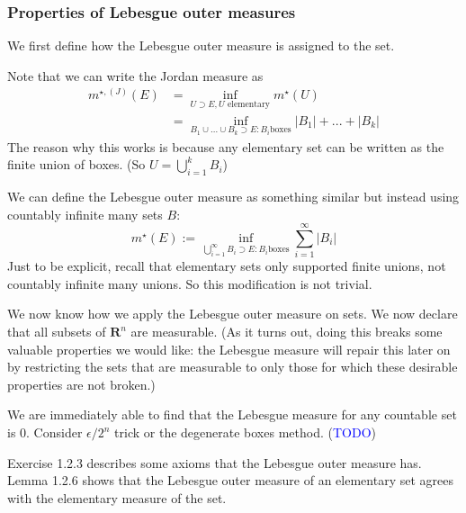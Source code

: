 \documentclass[answers,12pt]{exam}
\begin{document}
\subsubsection{Properties of Lebesgue outer measures}
We first define how the Lebesgue outer measure is assigned to the set.

Note that we can write the Jordan measure as 
\[
    \begin{aligned}
        m^{\star,(J)}(E) &= \inf_{U \supset E, U \text{ elementary}} m^{\star}(U)\\
        &= \inf_{B_1\cup...\cup B_k \supset E: B_i \text{boxes}}|B_1|+...+|B_k|
    \end{aligned}  
\]
The reason why this works is because any elementary set can be written as the finite union of boxes.
(So $U = \bigcup_{i=1}^k B_i$)

We can define the Lebesgue outer measure as something similar but instead using countably infinite many sets $B$:
\[m^{\star}(E):=\inf_{\bigcup_{i=1}^{\infty} B_i \supset E: B_i \text{boxes}} \sum_{i=1}^{\infty}|B_i|\]
Just to be explicit, recall that elementary sets only supported finite unions, not countably infinite many unions.
So this modification is not trivial.

We now know how we apply the Lebesgue outer measure on sets.
We now declare that all subsets of $\mathbf{R}^n$ are measurable.
(As it turns out, doing this breaks some valuable properties we would like: the Lebesgue measure will repair this later on by restricting the sets that are measurable to only those for which these desirable properties are not broken.)

We are immediately able to find that the Lebesgue measure for any countable set is 0.
Consider $\epsilon/2^n$ trick or the degenerate boxes method. 
(\textcolor{blue}{TODO})

Exercise 1.2.3 describes some axioms that the Lebesgue outer measure has.
Lemma 1.2.6 shows that the Lebesgue outer measure of an elementary set agrees with the elementary measure of the set.
\end{document}
